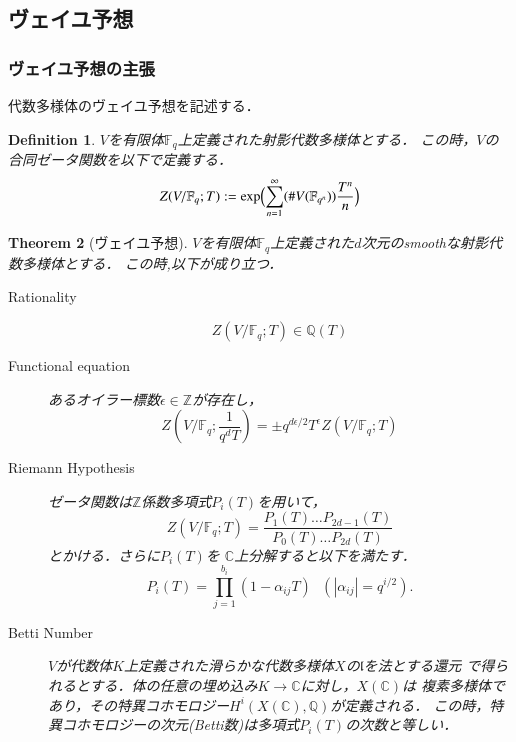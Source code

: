 \documentclass{ujarticle}
\newtheorem{thm}{Theorem}[section]
\newtheorem{dfn}[thm]{Definition}
\begin{document}
\subsection{ヴェイユ予想}
\label{sub:ヴェイユ予想}
\subsubsection{ヴェイユ予想の主張}
\label{subs:ゼータ関数とヴェイユ予想}

代数多様体のヴェイユ予想を記述する．
\begin{dfn}
    $V$を有限体$\mathbb{F}_q$上定義された射影代数多様体とする．
    この時，$V$の合同ゼータ関数を以下で定義する．
    \begin{equation*}
     Z(V/\mathbb{F}_q;T):= \mathrm{exp}\Bigl( \sum_{n=1}^{\infty}(\#V(\mathbb{F}_{q^n}))\frac{T^n}{n} \Bigr)
    \end{equation*}
\end{dfn}

\begin{thm}[ヴェイユ予想]
  $V$を有限体$\mathbb{F}_q$上定義された$d$次元のsmoothな射影代数多様体とする．
  この時,以下が成り立つ．
  \begin{description}
    \item[Rationality]
    \begin{equation*}
      Z(V/\mathbb{F}_q;T) \in \mathbb{Q}(T)
    \end{equation*}
    \item[Functional equation]
    あるオイラー標数$ \epsilon \in \mathbb{Z}$が存在し，
    \begin{equation}
      Z(V/\mathbb{F}_q;\frac{1}{q^dT})=\pm
      q^{d \epsilon/2}T^{\epsilon}Z(V/\mathbb{F}_q;T)
    \end{equation}
    \item[Riemann Hypothesis]
    ゼータ関数は$\mathbb{Z}$係数多項式$P_i(T)$を用いて，
    \begin{equation}
     Z(V/\mathbb{F}_q;T)=
     \frac{P_1(T)\dots P_{2d-1}(T)}{P_0(T)\dots P_{2d}(T)}
    \end{equation}
    とかける．さらに$P_i(T)$を
    $ \mathbb{C} $上分解すると以下を満たす．
    \begin{equation*}
     P_i(T)= \prod_{j=1}^{b_i}(1-\alpha_{ij}T) \mbox{ }
      (|\alpha_{ij}|=q^{i/2}).
    \end{equation*}
    \item[Betti Number]
    $V$が代数体$K$上定義された滑らかな代数多様体$X$の$\mathfrak{l}$を法とする還元
    で得られるとする．体の任意の埋め込み$K \to \mathbb{C}$に対し，$X(\mathbb{C})$は
    複素多様体であり，その特異コホモロジー$H^i(X(\mathbb{C}),\mathbb{Q})$が定義される．
    この時，特異コホモロジーの次元(Betti数)は多項式$P_i(T)$の次数と等しい．
  \end{description}
\end{thm}
\end{document}
